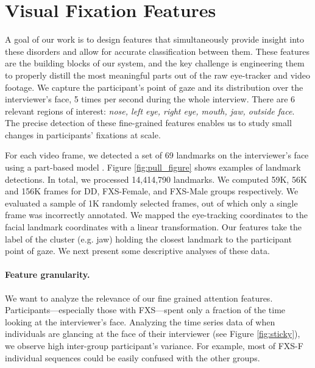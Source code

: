 \documentclass{llncs}
\begin{document}
  \vspace{-2 em}
  \section{Visual Fixation Features}
  \vspace{-1 em}
  \label{sec:feature_extraction}
A goal of our work is to design features that simultaneously provide insight into these disorders and allow for accurate classification between them. These features are the building blocks of our system, and the key challenge is engineering them to properly distill the most meaningful parts out of the raw eye-tracker and video footage. We capture the participant's point of gaze and its distribution over the interviewer's face, 5 times per second during the whole interview. There are 6 relevant regions of interest: \textit{nose, left eye, right eye, mouth, jaw, outside face}. The precise detection of these fine-grained features enables us to study small changes in participants' fixations at scale.


For each video frame, we detected a set of 69 landmarks on the interviewer's face using a part-based model \cite{dpmface}. Figure \ref{fig:pull_figure} shows examples of landmark detections. In total, we processed 14,414,790 landmarks. %
We computed 59K, 56K and 156K frames for DD, FXS-Female, and FXS-Male groups respectively. We evaluated a sample of 1K randomly selected frames, out of which only a single frame was incorrectly annotated. We mapped the eye-tracking coordinates to the facial landmark coordinates with a linear transformation. Our features take the label of the cluster (e.g. jaw) holding the closest landmark to the participant point of gaze. We next present some descriptive analyses of these data.


\paragraph{Feature granularity.} We want to analyze the relevance of our fine grained attention features.
Participants---especially those with FXS---spent only a fraction of the time looking at the interviewer's face. Analyzing the time series data of when individuals are glancing at the face of their interviewer (see Figure \ref{fig:sticky}), we observe high inter-group participant's variance. For example, most of FXS-F individual sequences could be easily confused with the other groups.
\end{document}
